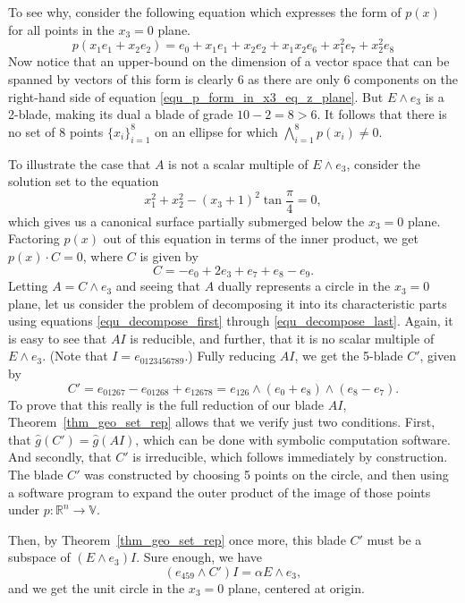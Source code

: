 \documentclass{birkjour}
\theoremstyle{definition}
\theoremstyle{remark}
\numberwithin{equation}{section}
\newcommand{\R}{\mathbb{R}}
\newcommand{\V}{\mathbb{V}}
\newcommand{\gh}{\hat{g}}
\begin{document}
To see why, consider the following equation which expresses the form of $p(x)$ for all points in the $x_3=0$ plane.
\begin{equation}\label{equ_p_form_in_x3_eq_z_plane}
p(x_1e_1+x_2e_2)=e_0 + x_1e_1 + x_2e_2 + x_1x_2e_6 + x_1^2e_7 + x_2^2e_8
\end{equation}
Now notice that an upper-bound on the dimension of a vector space that can be spanned by vectors
of this form is clearly 6 as there are only 6 components on the right-hand side of equation \eqref{equ_p_form_in_x3_eq_z_plane}.
But $E\wedge e_3$ is a 2-blade, making its dual a blade of grade $10-2=8>6$.  It follows that there is no set of
8 points $\{x_i\}_{i=1}^8$ on an ellipse for which $\bigwedge_{i=1}^8 p(x_i)\neq 0$.

To illustrate the case that $A$ is not a scalar multiple of $E\wedge e_3$, consider the solution set
to the equation
\begin{equation}
x_1^2 + x_2^2 - (x_3+1)^2\tan\frac{\pi}{4}=0,
\end{equation}
which gives us a canonical surface partially submerged below the $x_3=0$ plane.
Factoring $p(x)$ out of this equation in terms of the inner product, we get $p(x)\cdot C=0$,
where $C$ is given by
\begin{equation}
C = -e_0 + 2e_3 + e_7 + e_8 - e_9.
\end{equation}
Letting $A=C\wedge e_3$ and seeing that $A$ dually represents a circle in the $x_3=0$ plane, let us consider
the problem of decomposing it into its characteristic parts using equations
\eqref{equ_decompose_first} through \eqref{equ_decompose_last}.
Again, it is easy to see that $AI$ is reducible, and further, that it is no scalar multiple of $E\wedge e_3$.
(Note that $I=e_{0123456789}$.)
Fully reducing $AI$, we get the 5-blade $C'$, given by
\begin{equation}
C' = e_{01267} - e_{01268} + e_{12678} = e_{126}\wedge(e_0+e_8)\wedge(e_8-e_7).
\end{equation}
To prove that this really is the full reduction of our blade $AI$, Theorem~\ref{thm_geo_set_rep}
allows that we verify just two conditions.
First, that $\gh(C')=\gh(AI)$, which can be done with symbolic computation software.
And secondly, that $C'$ is irreducible, which follows immediately by construction.
The blade $C'$ was constructed by choosing 5 points on the circle, and then using a software
program to expand the outer product of the image of those points under $p:\R^n\to\V$.

Then, by Theorem~\ref{thm_geo_set_rep} once more, this blade $C'$ must be a subspace
of $(E\wedge e_3)I$.  Sure enough, we have
\begin{equation}
(e_{459}\wedge C')I = \alpha E\wedge e_3,
\end{equation}
and we get the unit circle in the $x_3=0$ plane, centered at origin.
\end{document}
